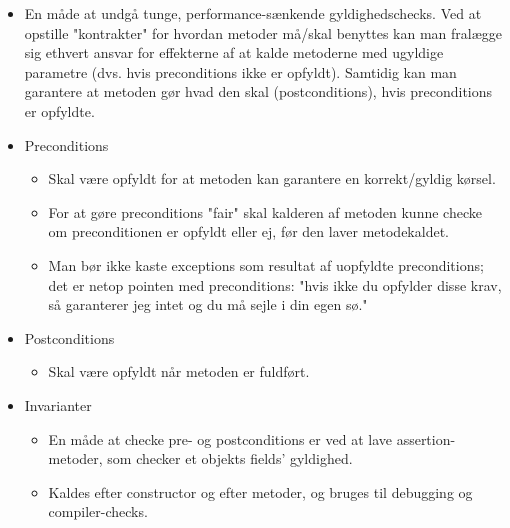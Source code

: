 \begin{itemize}
  \item En måde at undgå tunge, performance-sænkende gyldighedschecks. Ved at opstille "kontrakter" for hvordan metoder må/skal benyttes kan man fralægge sig ethvert ansvar for effekterne af at kalde metoderne med ugyldige parametre (dvs. hvis preconditions ikke er opfyldt). Samtidig kan man garantere at metoden gør hvad den skal (postconditions), hvis preconditions er opfyldte.
  \item Preconditions
  \begin{itemize}
    \item Skal være opfyldt for at metoden kan garantere en korrekt/gyldig kørsel.
    \item For at gøre preconditions "fair" skal kalderen af metoden kunne checke om preconditionen er opfyldt eller ej, før den laver metodekaldet.
    \item Man bør ikke kaste exceptions som resultat af uopfyldte preconditions; det er netop pointen med preconditions: "hvis ikke du opfylder disse krav, så garanterer jeg intet og du må sejle i din egen sø."
  \end{itemize}
  
  \item Postconditions
  \begin{itemize}
    \item Skal være opfyldt når metoden er fuldført.
  \end{itemize}
  
  \item Invarianter
  \begin{itemize}
    \item En måde at checke pre- og postconditions er ved at lave assertion-metoder, som checker et objekts fields' gyldighed.
    \item Kaldes efter constructor og efter metoder, og bruges til debugging og compiler-checks.
  \end{itemize}
\end{itemize}

